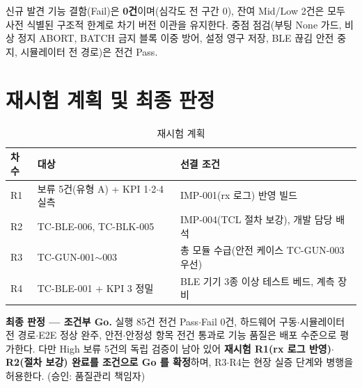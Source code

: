 신규 발견 기능 결함(Fail)은 \textbf{0건}이며(심각도 전 구간 0), 잔여 Mid/Low 2건은 모두
사전 식별된 구조적 한계로 차기 버전 이관을 유지한다. 중점 점검(부팅 None 가드, 비상 정지
ABORT, BATCH 금지 블록 이중 방어, 설정 영구 저장, BLE 끊김 안전 중지, 시뮬레이터 전
경로)은 전건 Pass.

\section{재시험 계획 및 최종 판정}
\begin{table}[htbp]\centering\small
\caption{재시험 계획}
\renewcommand{\arraystretch}{1.2}
\begin{tabularx}{\linewidth}{@{}l X X@{}}
\toprule
\sffamily 차수 & \sffamily 대상 & \sffamily 선결 조건 \\
\midrule
R1 & 보류 5건(유형 A) + KPI 1$\cdot$2$\cdot$4 실측 & IMP-001(rx 로그) 반영 빌드 \\
R2 & TC-BLE-006, TC-BLK-005 & IMP-004(TCL 절차 보강), 개발 담당 배석 \\
R3 & TC-GUN-001$\sim$003 & 총 모듈 수급(안전 케이스 TC-GUN-003 우선) \\
R4 & TC-BLE-001 + KPI 3 정밀 & BLE 기기 3종 이상 테스트 베드, 계측 장비 \\
\bottomrule
\end{tabularx}
\end{table}

\noindent\textbf{최종 판정 --- 조건부 Go.} 실행 85건 전건 Pass$\cdot$Fail 0건, 하드웨어
구동$\cdot$시뮬레이터 전 경로$\cdot$E2E 정상 완주, 안전$\cdot$안정성 항목 전건 통과로
기능 품질은 배포 수준으로 평가한다. 다만 High 보류 5건의 독립 검증이 남아 있어
\textbf{재시험 R1(rx 로그 반영)$\cdot$R2(절차 보강) 완료를 조건으로 Go 를 확정}하며,
R3$\cdot$R4는 현장 실증 단계와 병행을 허용한다. (승인: 품질관리 책임자)